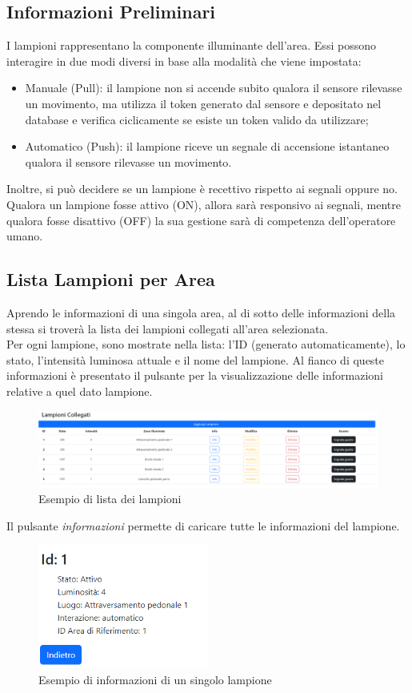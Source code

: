 \documentclass[a4paper, 12pt]{article}
\begin{document}
\subsection{Informazioni Preliminari}
I lampioni rappresentano la componente illuminante dell'area. Essi possono interagire in due modi diversi in base alla modalità che viene impostata:
\begin{itemize}
    \item Manuale (Pull): il lampione non si accende subito qualora il sensore rilevasse un movimento, ma utilizza il token generato dal sensore e depositato nel database e verifica ciclicamente se esiste un token valido da utilizzare;
    \item Automatico (Push): il lampione riceve un segnale di accensione istantaneo qualora il sensore rilevasse un movimento.
\end{itemize}
Inoltre, si può decidere se un lampione è recettivo rispetto ai segnali oppure no. Qualora un lampione fosse attivo (ON), allora sarà responsivo ai segnali, mentre qualora fosse disattivo (OFF) la sua gestione sarà di competenza dell'operatore umano.
\subsection{Lista Lampioni per Area}
Aprendo le informazioni di una singola area, al di sotto delle informazioni della stessa si troverà la lista dei lampioni collegati all'area selezionata.\\
Per ogni lampione, sono mostrate nella lista: l'ID (generato automaticamente), lo stato, l'intensità luminosa attuale e il nome del lampione. Al fianco di queste informazioni è presentato il pulsante per la visualizzazione delle informazioni relative a quel dato lampione.\\
\begin{figure}[H]
\centering
\includegraphics[width=\textwidth]{ListaLampioni}
\caption{Esempio di lista dei lampioni}
\end{figure}
Il pulsante \textit{informazioni} permette di caricare tutte le informazioni del lampione.\\
\begin{figure}[H]
\centering
\includegraphics[width=0.5\textwidth]{InfoLampione}
\caption{Esempio di informazioni di un singolo lampione}
\end{figure}
\end{document}
